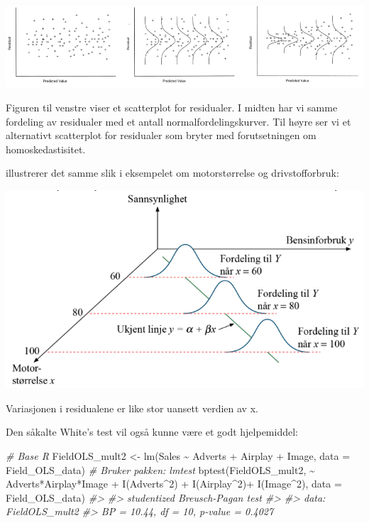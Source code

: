 \documentclass[
]{article}
\newenvironment{Shaded}{\begin{snugshade}}{\end{snugshade}}
\newcommand{\AttributeTok}[1]{\textcolor[rgb]{0.77,0.63,0.00}{#1}}
\newcommand{\CommentTok}[1]{\textcolor[rgb]{0.56,0.35,0.01}{\textit{#1}}}
\newcommand{\DecValTok}[1]{\textcolor[rgb]{0.00,0.00,0.81}{#1}}
\newcommand{\FunctionTok}[1]{\textcolor[rgb]{0.00,0.00,0.00}{#1}}
\newcommand{\NormalTok}[1]{#1}
\newcommand{\OtherTok}[1]{\textcolor[rgb]{0.56,0.35,0.01}{#1}}
\newcommand{\SpecialCharTok}[1]{\textcolor[rgb]{0.00,0.00,0.00}{#1}}
\begin{document}
\includegraphics{Heteroskedasicity.png}

Figuren til venstre viser et scatterplot for residualer. I midten har vi samme fordeling av residualer med et antall normalfordelingskurver. Til høyre ser vi et alternativt scatterplot for residualer som bryter med forutsetningen om homoskedastisitet.

\citet{lovasStatistikkUniversiteterOg2013} illustrerer det samme slik i eksempelet om motorstørrelse og drivstofforbruk:

\includegraphics{Homoskedastisitet.png}

Variasjonen i residualene er like stor uansett verdien av x.

Den såkalte White's test vil også kunne være et godt hjelpemiddel:

\begin{Shaded}
\begin{Highlighting}[]
\CommentTok{\# Base R}
\NormalTok{FieldOLS\_mult2 }\OtherTok{\textless{}{-}} \FunctionTok{lm}\NormalTok{(Sales }\SpecialCharTok{\textasciitilde{}}\NormalTok{ Adverts }\SpecialCharTok{+}\NormalTok{ Airplay }\SpecialCharTok{+}\NormalTok{ Image, }\AttributeTok{data =}\NormalTok{ Field\_OLS\_data)}
\CommentTok{\# Bruker pakken: lmtest}
\FunctionTok{bptest}\NormalTok{(FieldOLS\_mult2, }\SpecialCharTok{\textasciitilde{}}\NormalTok{ Adverts}\SpecialCharTok{*}\NormalTok{Airplay}\SpecialCharTok{*}\NormalTok{Image }\SpecialCharTok{+} \FunctionTok{I}\NormalTok{(Adverts}\SpecialCharTok{\^{}}\DecValTok{2}\NormalTok{) }\SpecialCharTok{+} \FunctionTok{I}\NormalTok{(Airplay}\SpecialCharTok{\^{}}\DecValTok{2}\NormalTok{)}\SpecialCharTok{+} \FunctionTok{I}\NormalTok{(Image}\SpecialCharTok{\^{}}\DecValTok{2}\NormalTok{), }\AttributeTok{data =}\NormalTok{ Field\_OLS\_data)}
\CommentTok{\#\textgreater{} }
\CommentTok{\#\textgreater{}  studentized Breusch{-}Pagan test}
\CommentTok{\#\textgreater{} }
\CommentTok{\#\textgreater{} data:  FieldOLS\_mult2}
\CommentTok{\#\textgreater{} BP = 10.44, df = 10, p{-}value = 0.4027}
\end{Highlighting}
\end{Shaded}
\end{document}
